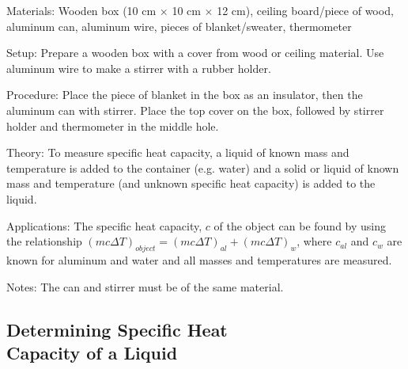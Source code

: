\begin{multicols}{2}
\begin{description*}
\item[Materials:]{Wooden box (10 cm $\times$ 10 cm $\times$ 12 cm), ceiling board/piece of wood, aluminum can, aluminum wire, pieces of blanket/sweater, thermometer}
\item[Setup:]{Prepare a wooden box with a cover from wood or ceiling material. Use aluminum wire to make a stirrer with a rubber holder.}
\item[Procedure:]{Place the piece of blanket in the box as an insulator, then the aluminum can with stirrer. Place the top cover on the box, followed by stirrer holder and thermometer in the middle hole.}
\item[Theory:]{To measure specific heat capacity, a liquid of known mass and temperature is added to the container (e.g. water) and a solid or liquid of known mass and temperature (and unknown specific heat capacity) is added to the liquid.}
\item[Applications:]{The specific heat capacity, $c$ of the object can be found by using the relationship $(mc\Delta T)_{object} = (mc\Delta T)_{al} + (mc\Delta T)_{w}$, where $c_{al}$ and $c_{w}$ are known for aluminum and water and all masses and temperatures are measured.}
\item[Notes:]{The can and stirrer must be of the same material.}
\end{description*}

\vfill
\columnbreak

\subsection[Determining Specific Heat Capacity of a Liquid]{Determining Specific Heat \hfill \\ Capacity of a Liquid}



\end{multicols}
